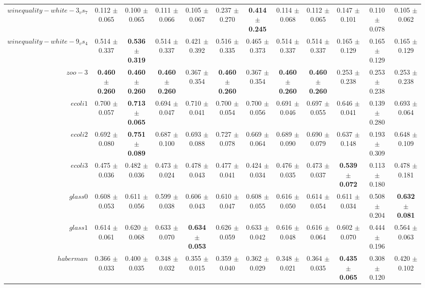 \begin{table}[!ht]
{\begin{tabular}{r c c c c c c c c c c c}
$winequality-white-3_vs_7$ & 0.112 $\pm$ 0.065 & 0.100 $\pm$ 0.065 & 0.111 $\pm$ 0.066 & 0.105 $\pm$ 0.067 & 0.237 $\pm$ 0.270 & \textbf{0.414 $\pm$ 0.245} & 0.114 $\pm$ 0.068 & 0.112 $\pm$ 0.065 & 0.147 $\pm$ 0.101 & 0.110 $\pm$ 0.078 & 0.105 $\pm$ 0.062 \\
$winequality-white-9_vs_4$ & 0.514 $\pm$ 0.337 & \textbf{0.536 $\pm$ 0.319} & 0.514 $\pm$ 0.337 & 0.421 $\pm$ 0.392 & 0.516 $\pm$ 0.335 & 0.465 $\pm$ 0.373 & 0.514 $\pm$ 0.337 & 0.514 $\pm$ 0.337 & 0.165 $\pm$ 0.129 & 0.165 $\pm$ 0.129 & 0.165 $\pm$ 0.129 \\
$zoo-3$ & \textbf{0.460 $\pm$ 0.260} & \textbf{0.460 $\pm$ 0.260} & \textbf{0.460 $\pm$ 0.260} & 0.367 $\pm$ 0.354 & \textbf{0.460 $\pm$ 0.260} & 0.367 $\pm$ 0.354 & \textbf{0.460 $\pm$ 0.260} & \textbf{0.460 $\pm$ 0.260} & 0.253 $\pm$ 0.238 & 0.253 $\pm$ 0.238 & 0.253 $\pm$ 0.238 \\
$ecoli1$ & 0.700 $\pm$ 0.057 & \textbf{0.713 $\pm$ 0.065} & 0.694 $\pm$ 0.047 & 0.710 $\pm$ 0.041 & 0.700 $\pm$ 0.054 & 0.700 $\pm$ 0.056 & 0.691 $\pm$ 0.046 & 0.697 $\pm$ 0.055 & 0.646 $\pm$ 0.041 & 0.139 $\pm$ 0.280 & 0.693 $\pm$ 0.064 \\
$ecoli2$ & 0.692 $\pm$ 0.080 & \textbf{0.751 $\pm$ 0.089} & 0.687 $\pm$ 0.100 & 0.693 $\pm$ 0.088 & 0.727 $\pm$ 0.078 & 0.669 $\pm$ 0.064 & 0.689 $\pm$ 0.090 & 0.690 $\pm$ 0.079 & 0.637 $\pm$ 0.148 & 0.193 $\pm$ 0.309 & 0.648 $\pm$ 0.109 \\
$ecoli3$ & 0.475 $\pm$ 0.036 & 0.482 $\pm$ 0.036 & 0.473 $\pm$ 0.024 & 0.478 $\pm$ 0.043 & 0.477 $\pm$ 0.041 & 0.424 $\pm$ 0.034 & 0.476 $\pm$ 0.035 & 0.473 $\pm$ 0.037 & \textbf{0.539 $\pm$ 0.072} & 0.113 $\pm$ 0.180 & 0.478 $\pm$ 0.181 \\
$glass0$ & 0.608 $\pm$ 0.053 & 0.611 $\pm$ 0.056 & 0.599 $\pm$ 0.038 & 0.606 $\pm$ 0.043 & 0.610 $\pm$ 0.047 & 0.608 $\pm$ 0.055 & 0.616 $\pm$ 0.050 & 0.614 $\pm$ 0.054 & 0.611 $\pm$ 0.034 & 0.508 $\pm$ 0.204 & \textbf{0.632 $\pm$ 0.081} \\
$glass1$ & 0.614 $\pm$ 0.061 & 0.620 $\pm$ 0.068 & 0.633 $\pm$ 0.070 & \textbf{0.634 $\pm$ 0.053} & 0.626 $\pm$ 0.059 & 0.633 $\pm$ 0.042 & 0.616 $\pm$ 0.048 & 0.616 $\pm$ 0.064 & 0.602 $\pm$ 0.070 & 0.444 $\pm$ 0.196 & 0.564 $\pm$ 0.063 \\
$haberman$ & 0.366 $\pm$ 0.033 & 0.400 $\pm$ 0.035 & 0.348 $\pm$ 0.032 & 0.355 $\pm$ 0.015 & 0.359 $\pm$ 0.040 & 0.362 $\pm$ 0.029 & 0.348 $\pm$ 0.021 & 0.364 $\pm$ 0.035 & \textbf{0.435 $\pm$ 0.065} & 0.308 $\pm$ 0.120 & 0.420 $\pm$ 0.102 \\

\end{tabular}}
\end{table}
